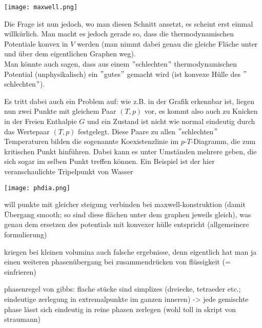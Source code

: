 \documentclass[../KlassMech_main.tex]{subfiles}
\begin{document}
\begin{center}
\texttt{[image: maxwell.png]}
\label{fig:}
\end{center}

Die Frage ist nun jedoch, wo man diesen Schnitt ansetzt, es scheint erst einmal willkürlich. Man macht es jedoch gerade so, dass die thermodynamischen Potentiale konvex in $V$ werden (man nimmt dabei genau die gleiche Fläche unter und über dem eigentlichen Graphen weg).\\
Man könnte auch sagen, dass aus einem $"$schlechten$"$ thermodynamischen Potential (unphysikalisch) ein $"$gutes$"$ gemacht wird (ist konvexe Hülle des $"$schlechten$"$).

Es tritt dabei auch ein Problem auf: wie z.B. in der Grafik erkennbar ist, liegen nun zwei Punkte mit gleichem Paar $(T, p)$ vor, es kommt also auch zu Knicken in der Freien Enthalpie $G$ und ein Zustand ist nicht wie normal eindeutig durch das Wertepaar $(T, p)$ festgelegt. Diese Paare zu allen $"$schlechten$"$ Temperaturen bilden die sogenannte Koexistenzlinie im $p$-$T$-Diagramm, die zum kritischen Punkt hinführen. Dabei kann es unter Umständen mehrere geben, die sich sogar im selben Punkt treffen können. Ein Beispiel ist der hier veranschaulichte Tripelpunkt von Wasser

\begin{center}
\texttt{[image: phdia.png]}
\label{fig:}
\end{center}



will punkte mit gleicher steigung verbinden bei maxwell-konstruktion (damit Übergang smooth; so sind diese flächen unter dem graphen jeweils gleich), was genau dem ersetzen des potentials mit konvexer hülle entspricht (allgemeinere formulierung)


kriegen bei kleinen volumina auch falsche ergebnisse, denn eigentlich hat man ja einen weiteren phasenübergang bei zusammendrücken von flüssigkeit (= einfrieren)

phasenregel von gibbs: flache stücke sind simplizes (dreiecke, tetraeder etc.; eindeutige zerlegung in extremalpunkte im ganzen inneren) -> jede gemischte phase lässt sich eindeutig in reine phasen zerlegen (wohl toll in skript von straumann)
\end{document}
